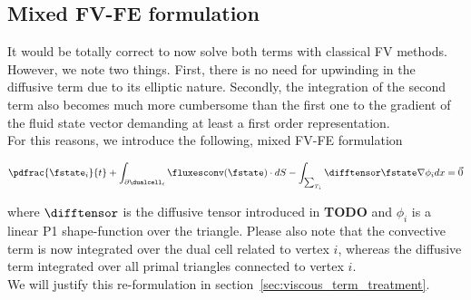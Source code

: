 \documentclass[../main.tex]{subfiles}
\begin{document}
\subsection{Mixed \ac{FV}-\ac{FE} formulation}\label{sec:mixed_FV_FE_formulation}
It would be totally correct to now solve both terms with classical \ac{FV} methods. However, we note two things. First, there is no need for upwinding in the diffusive term due to its elliptic nature.
Secondly, the integration of the second term also becomes much more cumbersome than the first one to the gradient of the fluid state vector demanding at least a first order representation.\\
For this reasons, we introduce the following, mixed \ac{FV}-\ac{FE} formulation

\begin{align}\label{eq_mixed_FV_FE}
\pdfrac{\fstate_i}{t} +
\int_{\partial\dualcell_i} \fluxesconv(\fstate)\cdot dS -
\int_{\sum_{T_i}} \difftensor \fstate \nabla \phi_i dx =
\vec{0}
\end{align}

where $\difftensor$ is the diffusive tensor introduced in \textbf{TODO} and $\phi_i$ is a linear P1 shape-function over the triangle.
Please also note that the convective term is now integrated over the dual cell related to vertex $i$, whereas the diffusive term integrated over all primal triangles connected to vertex $i$.\\
We will justify this re-formulation in section~\ref{sec:viscous_term_treatment}.
\end{document}
